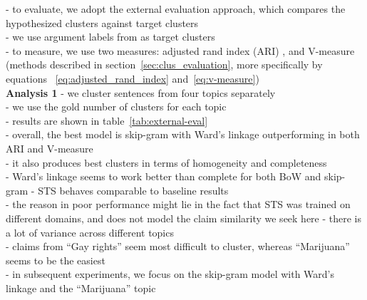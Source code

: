 \noindent - to evaluate, we adopt the external evaluation approach, which compares the 
hypothesized clusters against target clusters \\
- we use argument labels from \citet{hasan2014you} as target clusters \\
- to measure, we use two measures: adjusted rand index (ARI) 
\citep{steinley2004properties}, and V-measure \citep{rosenberg2007v}
(methods described in section~\ref{sec:clus_evaluation}, more specifically by equations
~\ref{eq:adjusted_rand_index} and~\ref{eq:v-measure})
\\

\noindent \textbf{Analysis 1} - we cluster sentences from four topics separately \\
- we use the gold number of clusters for each topic \\
- results are shown in table~\ref{tab:external-eval} \\
- overall, the best model is skip-gram with Ward's linkage 
outperforming in both ARI and V-measure \\
- it also produces best clusters in terms of homogeneity and 
completeness \\
- Ward's linkage seems to work better than complete for both BoW and skip-gram
- STS behaves comparable to baseline results \\
- the reason in poor performance might lie in the fact that STS was trained 
on different domains, and does not model the claim similarity we seek here 
- there is a lot of variance across different topics \\
- claims from ``Gay rights'' seem most difficult to cluster, whereas 
``Marijuana'' seems to be the easiest \\
- in subsequent experiments, we focus on the skip-gram model 
with Ward's linkage and the ``Marijuana'' topic \\

